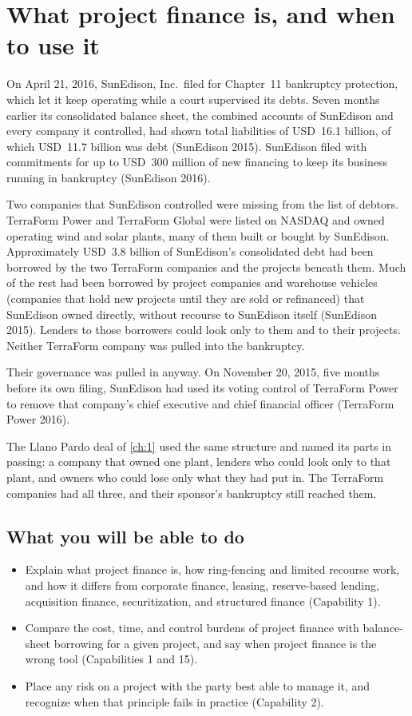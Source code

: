 \chapter{What project finance is, and when to use it}\label{ch:2}

On April 21, 2016, SunEdison, Inc.\ filed for Chapter~11 bankruptcy protection, which let it keep operating while a court supervised its debts. Seven months earlier its consolidated balance sheet, the combined accounts of SunEdison and every company it controlled, had shown total liabilities of USD~16.1 billion, of which USD~11.7 billion was debt (SunEdison 2015). SunEdison filed with commitments for up to USD~300 million of new financing to keep its business running in bankruptcy (SunEdison 2016).

Two companies that SunEdison controlled were missing from the list of debtors. TerraForm Power and TerraForm Global were listed on NASDAQ and owned operating wind and solar plants, many of them built or bought by SunEdison. Approximately USD~3.8 billion of SunEdison's consolidated debt had been borrowed by the two TerraForm companies and the projects beneath them. Much of the rest had been borrowed by project companies and warehouse vehicles (companies that hold new projects until they are sold or refinanced) that SunEdison owned directly, without recourse to SunEdison itself (SunEdison 2015). Lenders to those borrowers could look only to them and to their projects. Neither TerraForm company was pulled into the bankruptcy.

Their governance was pulled in anyway. On November 20, 2015, five months before its own filing, SunEdison had used its voting control of TerraForm Power to remove that company's chief executive and chief financial officer (TerraForm Power 2016).

The Llano Pardo deal of \cref{ch:1} used the same structure and named its parts in passing: a company that owned one plant, lenders who could look only to that plant, and owners who could lose only what they had put in. The TerraForm companies had all three, and their sponsor's bankruptcy still reached them.

\section*{What you will be able to do}
\begin{itemize}
  \item Explain what project finance is, how ring-fencing and limited recourse work, and how it differs from corporate finance, leasing, reserve-based lending, acquisition finance, securitization, and structured finance (Capability 1).
  \item Compare the cost, time, and control burdens of project finance with balance-sheet borrowing for a given project, and say when project finance is the wrong tool (Capabilities 1 and 15).
  \item Place any risk on a project with the party best able to manage it, and recognize when that principle fails in practice (Capability 2).
\end{itemize}

